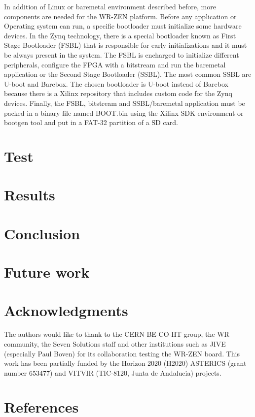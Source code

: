 \documentclass[review]{elsarticle}
\begin{document}
In addition of Linux or baremetal environment described before, more components are needed  for the WR-ZEN platform. Before any application or Operating system can run, a specific bootloader must initialize some hardware devices. In the Zynq technology, there is a special bootloader known as First Stage Bootloader (FSBL) that is responsible for early initializations and it must be always present in the system. The FSBL is encharged to initialize different peripherals, configure the FPGA with a bitstream and run the baremetal application or the Second Stage Bootloader (SSBL). The most common SSBL are U-boot and Barebox. The chosen bootloader is U-boot instead of Barebox because there is a Xilinx repository that includes custom code for the Zynq devices. Finally, the FSBL, bitstream and SSBL/baremetal application must be packed in a binary file named BOOT.bin using the Xilinx SDK environment or bootgen tool and put in a FAT-32 partition of a SD card.

\section{Test}

\section{Results}

\section{Conclusion}

\section{Future work}

\section{Acknowledgments}

The authors would like to thank to the CERN BE-CO-HT group, the WR community, the Seven Solutions staff and
other institutions such as JIVE (especially Paul Boven) for its collaboration testing the
WR-ZEN board. This work has been partially funded by the
Horizon 2020 (H2020) ASTERICS (grant number 653477) and
VITVIR (TIC-8120, Junta de Andalucia) projects.

\section*{References}


\end{document}
